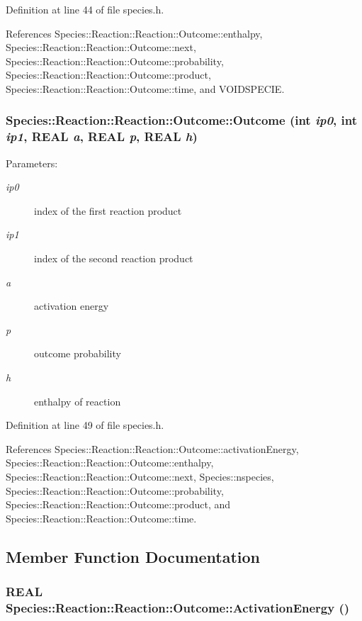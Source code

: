 Definition at line 44 of file species.h.

References Species::Reaction::Reaction::Outcome::enthalpy, Species::Reaction::Reaction::Outcome::next, Species::Reaction::Reaction::Outcome::probability, Species::Reaction::Reaction::Outcome::product, Species::Reaction::Reaction::Outcome::time, and VOIDSPECIE.\hypertarget{structSpecies_1_1Reaction_1_1Outcome_86196a9fb4193115c2c6517c3b52c8e7}{
\subsubsection[{Outcome}]{\setlength{\rightskip}{0pt plus 5cm}Species::Reaction::Reaction::Outcome::Outcome (int {\em ip0}, \/  int {\em ip1}, \/  REAL {\em a}, \/  REAL {\em p}, \/  REAL {\em h})}}
\label{structSpecies_1_1Reaction_1_1Outcome_86196a9fb4193115c2c6517c3b52c8e7}


\begin{Desc}
\item[Parameters:]
\begin{description}
\item[{\em ip0}]index of the first reaction product \item[{\em ip1}]index of the second reaction product \item[{\em a}]activation energy \item[{\em p}]outcome probability \item[{\em h}]enthalpy of reaction \end{description}
\end{Desc}


Definition at line 49 of file species.h.

References Species::Reaction::Reaction::Outcome::activationEnergy, Species::Reaction::Reaction::Outcome::enthalpy, Species::Reaction::Reaction::Outcome::next, Species::nspecies, Species::Reaction::Reaction::Outcome::probability, Species::Reaction::Reaction::Outcome::product, and Species::Reaction::Reaction::Outcome::time.

\subsection{Member Function Documentation}
\hypertarget{structSpecies_1_1Reaction_1_1Outcome_7643a1714101a15a49b52137a414bcb3}{
\subsubsection[{ActivationEnergy}]{\setlength{\rightskip}{0pt plus 5cm}REAL Species::Reaction::Reaction::Outcome::ActivationEnergy ()}}
\label{structSpecies_1_1Reaction_1_1Outcome_7643a1714101a15a49b52137a414bcb3}




